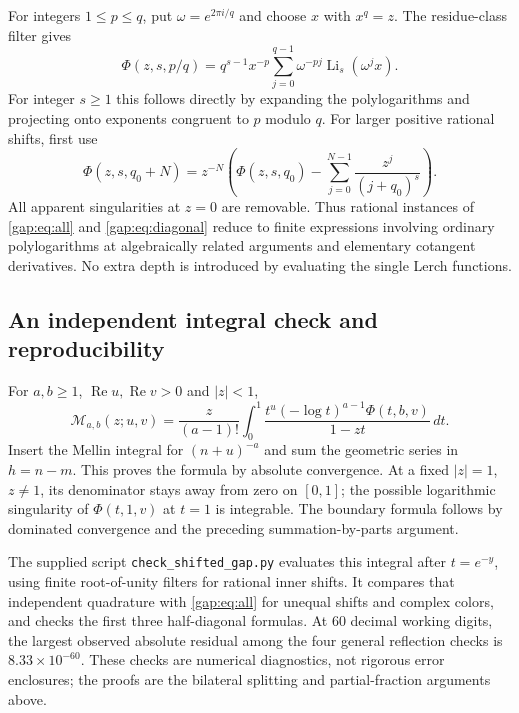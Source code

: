 \documentclass[11pt,letterpaper]{article}
\numberwithin{equation}{section}
\theoremstyle{plain}
\theoremstyle{definition}
\theoremstyle{remark}
\begin{document}
For integers $1\leq p\leq q$, put $\omega=e^{2\pi i/q}$ and choose
$x$ with $x^q=z$. The residue-class filter gives
\begin{equation}\label{gap:eq:rational-filter}
 \Phi(z,s,p/q)=q^{s-1}x^{-p}
    \sum_{j=0}^{q-1}\omega^{-pj}
                    \operatorname{Li}_s(\omega^j x).
\end{equation}
For integer $s\geq1$ this follows directly by expanding the
polylogarithms and projecting onto exponents congruent to $p$ modulo
$q$. For larger positive rational shifts, first use
\[
 \Phi(z,s,q_0+N)=z^{-N}
 \left(\Phi(z,s,q_0)-\sum_{j=0}^{N-1}\frac{z^j}{(j+q_0)^s}\right).
\]
All apparent singularities at $z=0$ are removable. Thus rational
instances of \eqref{gap:eq:all} and \eqref{gap:eq:diagonal} reduce to
finite expressions involving ordinary polylogarithms at algebraically
related arguments and elementary cotangent derivatives. No extra
depth is introduced by evaluating the single Lerch functions.

\subsection{An independent integral check and reproducibility}

For $a,b\geq1$, $\operatorname{Re}u,\operatorname{Re}v>0$ and
$|z|<1$,
\begin{equation}\label{gap:eq:integral}
 \mathcal M_{a,b}(z;u,v)
 =\frac z{(a-1)!}\int_0^1
       \frac{t^u(-\log t)^{a-1}\Phi(t,b,v)}{1-zt}\,dt.
\end{equation}
Insert the Mellin integral for $(n+u)^{-a}$ and sum the geometric
series in $h=n-m$. This proves the formula by absolute convergence.
At a fixed $|z|=1$, $z\ne1$, its denominator stays away from zero on
$[0,1]$; the possible logarithmic singularity of $\Phi(t,1,v)$ at
$t=1$ is integrable. The boundary formula follows by dominated
convergence and the preceding summation-by-parts argument.

The supplied script \texttt{check\_shifted\_gap.py} evaluates this
integral after $t=e^{-y}$, using finite root-of-unity filters for
rational inner shifts. It compares that independent quadrature with
\eqref{gap:eq:all} for unequal shifts and complex colors, and checks
the first three half-diagonal formulas. At 60 decimal working digits,
the largest observed absolute residual among the four general
reflection checks is $8.33\times10^{-60}$. These checks are numerical
diagnostics, not rigorous error enclosures; the proofs are the
bilateral splitting and partial-fraction arguments above.
\end{document}
